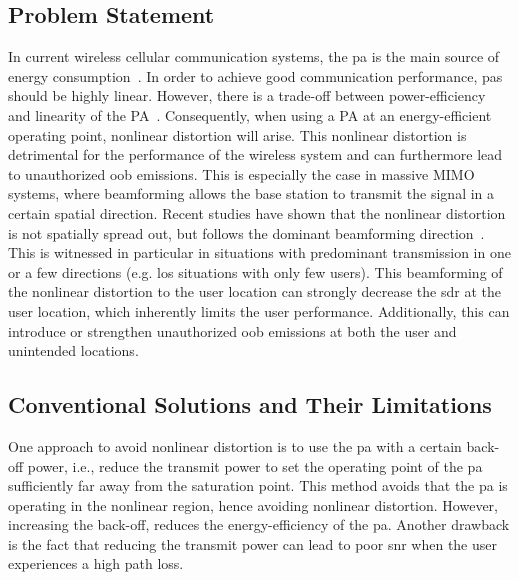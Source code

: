 \documentclass[conference]{IEEEtran}
\newcommand{\liesbet}[1]{{\color{olive}[Liesbet: #1]}}
\begin{document}
\subsection{Problem Statement}
In current wireless cellular communication systems, the \gls{pa} is the main source of energy consumption~\cite{energy}. In order to achieve good communication performance, \glspl{pa} should be highly linear. However, there is a trade-off between power-efficiency and linearity of the PA~\cite{pa_for_wireless}. Consequently, when using a PA at an energy-efficient operating point, nonlinear distortion will arise. This nonlinear distortion is detrimental for the performance of the wireless system and can furthermore lead to unauthorized \gls{oob} emissions. This is especially the case in massive MIMO systems, where beamforming allows the base station to transmit the signal in a certain spatial direction. Recent studies have shown that the nonlinear distortion is not spatially spread out, but follows the dominant beamforming direction~\cite{distortion_beamformed, distortion_beamformed2}. This is witnessed in particular in situations with predominant transmission in one or a few directions (e.g. \gls{los} situations with only few users). This beamforming of the nonlinear distortion to the user location can strongly decrease the \gls{sdr} at the user location, which inherently limits the user performance. Additionally, this can introduce or strengthen unauthorized \gls{oob} emissions at both the user and unintended locations. 



\subsection{Conventional Solutions and Their Limitations}
One approach to avoid nonlinear distortion is to use the \gls{pa} with a certain back-off power, i.e., reduce the transmit power to set the operating point of the \gls{pa} sufficiently far away from the saturation point. This method avoids that the \gls{pa} is operating in the nonlinear region, hence avoiding nonlinear distortion. However, increasing the back-off, reduces the energy-efficiency of the \gls{pa}. Another drawback is the fact that reducing the transmit power can lead to poor \gls{snr} when the user experiences a high path loss.   
\end{document}
